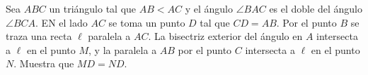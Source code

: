 Sea $ABC$ un triángulo tal que $AB\lt AC$ y el ángulo $\angle BAC$ es el doble del ángulo $\angle BCA$. EN el lado $AC$ se toma un punto $D$ tal que $CD=AB$. Por el punto $B$ se traza una recta $\ell$ paralela a $AC$. La bisectriz exterior del ángulo en $A$ intersecta a $\ell$ en el punto $M$, y la paralela a $AB$ por el punto $C$ intersecta a $\ell$ en el punto $N$. Muestra que $MD=ND$.